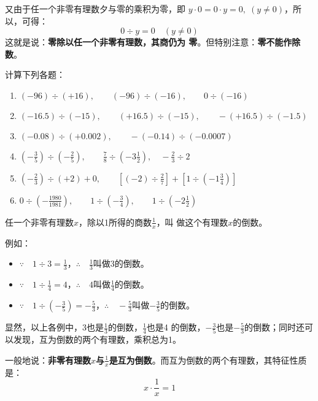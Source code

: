 又由于任一个非零有理数夕与零的乘积为零，即
$y\cdot 0=0\cdot y=0,\; (y\ne 0)$，所以，可得：
              \[0\div y=0\quad  (y\ne 0)\]
    这就是说：\textbf{零除以任一个非零有理数，其商仍为
零}。但特别注意：\textbf{零不能作除数}。


\begin{ex}
计算下列各题：
\begin{enumerate}
    \item $(-96)\div (+16),\qquad (-96)\div (-16),\qquad 0\div (-16)$
    \item $(-16.5)\div (-15),\qquad (+16.5)\div (-15),\qquad -(+16.5)\div (-1.5)$
    \item $(-0.08)\div(+0.002),\qquad -(-0.14)\div (-0.0007)$
    \item $\left(-\frac{3}{5}\right)\div \left(-\frac{2}{5}\right),\qquad \frac{7}{8}\div \left(-3\frac{1}{2}\right),\quad -\frac{2}{3}\div 2$
    \item $\left(-\frac{2}{3}\right)\div (+2) +0,\qquad \left[(-2)\div \frac{2}{7}\right]+\left[1\div\left(-1\frac{3}{4}\right)\right]$
    \item $0\div \left(-\frac{1980}{1981}\right),\qquad 1\div\left(-\frac{3}{4}\right),\qquad 1\div\left(-2\frac{1}{2}\right)$
\end{enumerate}
\end{ex}

\begin{blk}{}
    任一个非零有理数$x$，除以1所得的商数$\frac{1}{x}$，叫
做这个有理数$x$的倒数。
\end{blk}

例如：
\begin{itemize}
    \item $\because\quad 1\div 3=\frac{1}{3}$，\qquad $\therefore\quad \frac{1}{3}$叫做3的倒数。
    \item $\because\quad 1\div \frac{1}{4}=4$，\qquad $\therefore\quad 4$叫做$\frac{1}{4}$的倒数。
    \item $\because\quad 1\div \left(-\frac{3}{5}\right)=-\frac{5}{3}$，\qquad  $\therefore\quad -\frac{5}{3}$叫做$-\frac{3}{5}$的倒数。
\end{itemize}

  显然，以上各例中，3也是$\frac{1}{3}$的倒数，$\frac{1}{4}$也是4
的倒数，$-\frac{3}{5}$也是$-\frac{5}{3}$的倒数；同时还可以发现，互为倒数的两个有理数，乘积总为1。

  一般地说：\textbf{非零有理数$x$与$\frac{1}{x}$是互为倒数}。而互为倒数的两个有理数，其特征性质是：
\[x\cdot \frac{1}{x}=1\]
  
